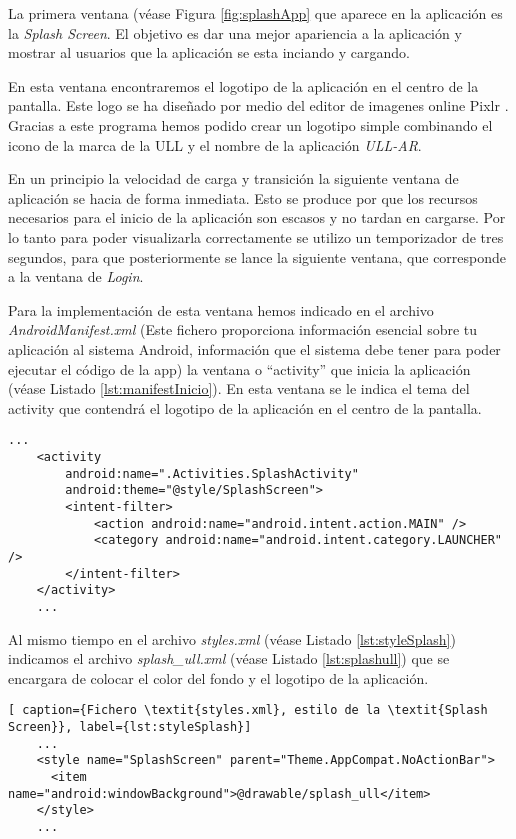 La primera ventana (véase Figura \ref{fig:splashApp} que aparece en la aplicación es la \textit{Splash Screen}. El objetivo es dar una mejor apariencia a la aplicación y mostrar al usuarios que la aplicación se esta inciando y cargando. 

En esta ventana encontraremos el logotipo de la aplicación en el centro de la pantalla. Este logo se ha diseñado por medio del editor de imagenes online Pixlr \cite{URL::pixlr}. Gracias a este programa hemos podido crear un logotipo simple combinando el icono de la marca de la ULL y el nombre de la aplicación \textit{ULL-AR}.

En un principio la velocidad de carga y transición la siguiente ventana de aplicación se hacia de forma inmediata. Esto se produce por que los recursos necesarios para el inicio de la aplicación son escasos y no tardan en cargarse. Por lo tanto para poder visualizarla correctamente se utilizo un temporizador de tres segundos, para que posteriormente se lance la siguiente ventana, que corresponde a la ventana de \textit{Login}.

Para la implementación de esta ventana hemos indicado en el archivo \textit{AndroidManifest.xml} (Este fichero proporciona información esencial sobre tu aplicación al sistema Android, información que el sistema debe tener para poder ejecutar el código de la app) la ventana o ``activity'' \cite{URL::activity} que inicia la aplicación (véase Listado \ref{lst:manifestInicio}). En esta ventana se le indica el tema del activity que contendrá el logotipo de la aplicación en el centro de la pantalla.
\bigskip
\bigskip
\bigskip
\bigskip

\begin{lstlisting}[caption={Fichero \textit{AndroidManifest.xml}, activity que inicia la aplicación}, label={lst:manifestInicio}]
    ...
    <activity
        android:name=".Activities.SplashActivity"
        android:theme="@style/SplashScreen">
        <intent-filter>
            <action android:name="android.intent.action.MAIN" />
            <category android:name="android.intent.category.LAUNCHER" />
        </intent-filter>
    </activity>
    ...
\end{lstlisting}

Al mismo tiempo en el archivo \textit{styles.xml} (véase Listado \ref{lst:styleSplash}) indicamos el archivo \textit{splash\_ull.xml} (véase Listado \ref{lst:splashull}) que se encargara de colocar el color del fondo y el logotipo de la aplicación. 

\begin{lstlisting}[ caption={Fichero \textit{styles.xml}, estilo de la \textit{Splash Screen}}, label={lst:styleSplash}]
    ...
    <style name="SplashScreen" parent="Theme.AppCompat.NoActionBar">
      <item name="android:windowBackground">@drawable/splash_ull</item>
    </style>
    ...
\end{lstlisting}





